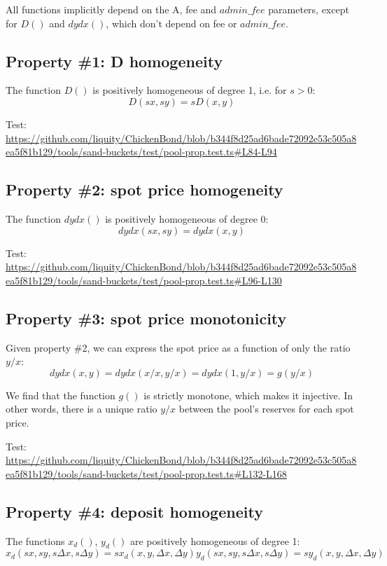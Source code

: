 \documentclass{article}
\begin{document}
All functions implicitly depend on the A, fee and $admin\_fee$ parameters, except for $D()$ and $dydx()$, which don’t depend on fee or $admin\_fee$.

\subsection{Property \#1: D homogeneity}

The function $D()$ is positively homogeneous of degree 1, i.e. for $s > 0$:
\[
D(sx, sy) = sD(x,y)
\]

Test:
\url{https://github.com/liquity/ChickenBond/blob/b344f8d25ad6bade72092e53c505a8ea5f81b129/tools/sand-buckets/test/pool-prop.test.ts#L84-L94}

\subsection{Property \#2: spot price homogeneity}

The function $dydx()$ is positively homogeneous of degree 0:
\[
dydx(sx, sy) = dydx(x, y)
\]

Test:
\url{https://github.com/liquity/ChickenBond/blob/b344f8d25ad6bade72092e53c505a8ea5f81b129/tools/sand-buckets/test/pool-prop.test.ts#L96-L130}

\subsection{Property \#3: spot price monotonicity}

Given property \#2, we can express the spot price as a function of only the ratio $y/x$:
\[
dydx(x, y) = dydx(x/x, y/x) = dydx(1, y/x) = g(y/x)
\]

We find that the function $g()$ is strictly monotone, which makes it injective. In other words, there is a unique ratio $y/x$ between the pool’s reserves for each spot price.

Test:
\url{https://github.com/liquity/ChickenBond/blob/b344f8d25ad6bade72092e53c505a8ea5f81b129/tools/sand-buckets/test/pool-prop.test.ts#L132-L168}

\subsection{Property \#4: deposit homogeneity}

The functions $x_d()$, $y_d()$ are positively homogeneous of degree 1:
\[
x_d(sx, sy, s\Delta{x}, s\Delta{y}) = s x_d(x, y, \Delta{x}, \Delta{y})
y_d(sx, sy, s\Delta{x}, s\Delta{y}) = s y_d(x, y, \Delta{x}, \Delta{y})
\]
\end{document}
